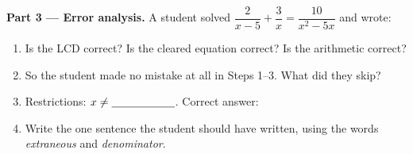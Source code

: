 \documentclass[10pt]{article}
\begin{document}
\begin{tcolorbox}[colback=white, colframe=black!40, title=\textbf{Tier A --- Approaching Proficiency},
    fonttitle=\bfseries, arc=1.5mm, left=3mm, right=3mm, top=2mm, bottom=2mm, breakable]
\vspace{4pt}
\textbf{Part 3 --- Error analysis.} A student solved $\dfrac{2}{x-5}+\dfrac{3}{x}=\dfrac{10}{x^2-5x}$
and wrote:
\begin{center}
\end{center}
\begin{enumerate}[label=(\alph*), leftmargin=2.1em, itemsep=5pt]
  \item Is the LCD correct? \blank{1.0cm} \; Is the cleared equation correct? \blank{1.0cm} \;
        Is the arithmetic correct? \blank{1.0cm}
  \item So the student made no mistake at all in Steps 1--3. What did they skip? \blank{4.6cm}
  \item Restrictions: $x\neq\blank{2.0cm}$. \; Correct answer: \blank{3.0cm}
  \item Write the one sentence the student should have written, using the words \emph{extraneous} and
        \emph{denominator}. 
\end{enumerate}
\end{tcolorbox}
\end{document}
